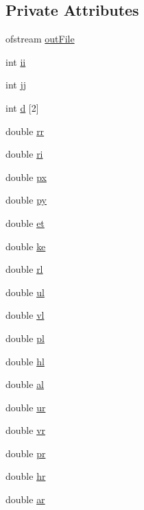 \subsection*{Private Attributes}
\begin{DoxyCompactItemize}
\item 
ofstream \hyperlink{classRoe_a0738570cd964a053cb95f219adc0ef1c}{out\+File}
\item 
int \hyperlink{classRoe_ae1d4f32b4c3d8e5d9d1225bec139fb71}{ii}
\item 
int \hyperlink{classRoe_a925c5191227cccf071e6e0b0ac198c67}{jj}
\item 
int \hyperlink{classRoe_a20a2e7114639c312295adad848a9ba06}{d} \mbox{[}2\mbox{]}
\item 
double \hyperlink{classRoe_a4c6b1752f3de01ed67d4bcb128bc9582}{rr}
\item 
double \hyperlink{classRoe_a8fc80cf00a5f985d55580becb9e7b2e3}{ri}
\item 
double \hyperlink{classRoe_a02cb59599c38a21472777e9de7f6f1ed}{px}
\item 
double \hyperlink{classRoe_a4d74b032fc909bf6b50989bacd908e03}{py}
\item 
double \hyperlink{classRoe_a088ea1d21e7f2a79a833c79de564fe97}{et}
\item 
double \hyperlink{classRoe_aa3b9084d2014f158b13820aab143ee7b}{ke}
\item 
double \hyperlink{classRoe_a5b749a16ae02029d4f9566251c7e6062}{rl}
\item 
double \hyperlink{classRoe_a296c4c3e1342d0f7a3b74db532d25da4}{ul}
\item 
double \hyperlink{classRoe_a9c7ca2b690bd235643559386ece348c1}{vl}
\item 
double \hyperlink{classRoe_a3c095fb6ac32aab0777a9438ae87ecb6}{pl}
\item 
double \hyperlink{classRoe_abdc3186ec87bc861a4082e6ca41a9d71}{hl}
\item 
double \hyperlink{classRoe_a3fe943eae01a90270cf6045fc4dfdcdf}{al}
\item 
double \hyperlink{classRoe_ab11ce73f25fa828140bea0f820a74844}{ur}
\item 
double \hyperlink{classRoe_a69d1aa7c0230640c1c0cc50061a6d1d2}{vr}
\item 
double \hyperlink{classRoe_a192ea3de117ed94fe04d244cb2174785}{pr}
\item 
double \hyperlink{classRoe_a835acb6a5f019b3a37b2a27367621e50}{hr}
\item 
double \hyperlink{classRoe_afcb0ba2c21329c19b0e463bb453b8ed9}{ar}

\end{DoxyCompactItemize}
